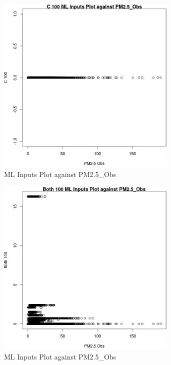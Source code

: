\begin{figure} 
\centering  
\includegraphics[width=0.77\textwidth]{Code_Outputs/Report_ML_input_PM25_Step4_part_e_de_duplicated_aves_C_100vPM25_Obs.jpg} 
\caption{\label{fig:Report_ML_input_PM25_Step4_part_e_de_duplicated_avesC_100vPM25_Obs}ML Inputs Plot against PM2.5_Obs} 
\end{figure} 
 

\begin{figure} 
\centering  
\includegraphics[width=0.77\textwidth]{Code_Outputs/Report_ML_input_PM25_Step4_part_e_de_duplicated_aves_Both_100vPM25_Obs.jpg} 
\caption{\label{fig:Report_ML_input_PM25_Step4_part_e_de_duplicated_avesBoth_100vPM25_Obs}ML Inputs Plot against PM2.5_Obs} 
\end{figure} 
 


